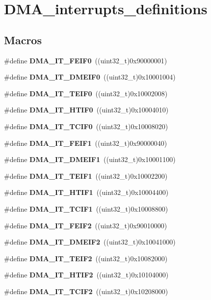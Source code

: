 \section{D\+M\+A\+\_\+interrupts\+\_\+definitions}
\label{group__DMA__interrupts__definitions}
\subsection*{Macros}
\begin{DoxyCompactItemize}
\item 
\#define \textbf{ D\+M\+A\+\_\+\+I\+T\+\_\+\+F\+E\+I\+F0}~((uint32\+\_\+t)0x90000001)
\item 
\#define \textbf{ D\+M\+A\+\_\+\+I\+T\+\_\+\+D\+M\+E\+I\+F0}~((uint32\+\_\+t)0x10001004)
\item 
\#define \textbf{ D\+M\+A\+\_\+\+I\+T\+\_\+\+T\+E\+I\+F0}~((uint32\+\_\+t)0x10002008)
\item 
\#define \textbf{ D\+M\+A\+\_\+\+I\+T\+\_\+\+H\+T\+I\+F0}~((uint32\+\_\+t)0x10004010)
\item 
\#define \textbf{ D\+M\+A\+\_\+\+I\+T\+\_\+\+T\+C\+I\+F0}~((uint32\+\_\+t)0x10008020)
\item 
\#define \textbf{ D\+M\+A\+\_\+\+I\+T\+\_\+\+F\+E\+I\+F1}~((uint32\+\_\+t)0x90000040)
\item 
\#define \textbf{ D\+M\+A\+\_\+\+I\+T\+\_\+\+D\+M\+E\+I\+F1}~((uint32\+\_\+t)0x10001100)
\item 
\#define \textbf{ D\+M\+A\+\_\+\+I\+T\+\_\+\+T\+E\+I\+F1}~((uint32\+\_\+t)0x10002200)
\item 
\#define \textbf{ D\+M\+A\+\_\+\+I\+T\+\_\+\+H\+T\+I\+F1}~((uint32\+\_\+t)0x10004400)
\item 
\#define \textbf{ D\+M\+A\+\_\+\+I\+T\+\_\+\+T\+C\+I\+F1}~((uint32\+\_\+t)0x10008800)
\item 
\#define \textbf{ D\+M\+A\+\_\+\+I\+T\+\_\+\+F\+E\+I\+F2}~((uint32\+\_\+t)0x90010000)
\item 
\#define \textbf{ D\+M\+A\+\_\+\+I\+T\+\_\+\+D\+M\+E\+I\+F2}~((uint32\+\_\+t)0x10041000)
\item 
\#define \textbf{ D\+M\+A\+\_\+\+I\+T\+\_\+\+T\+E\+I\+F2}~((uint32\+\_\+t)0x10082000)
\item 
\#define \textbf{ D\+M\+A\+\_\+\+I\+T\+\_\+\+H\+T\+I\+F2}~((uint32\+\_\+t)0x10104000)
\item 
\#define \textbf{ D\+M\+A\+\_\+\+I\+T\+\_\+\+T\+C\+I\+F2}~((uint32\+\_\+t)0x10208000)
\item 

\end{DoxyCompactItemize}
